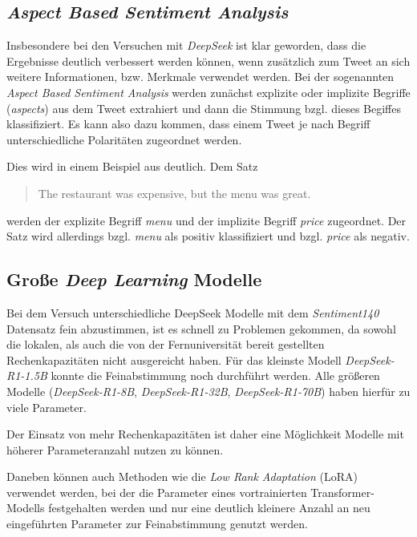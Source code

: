 \subsection{\textit{Aspect Based Sentiment Analysis}}
Insbesondere bei den Versuchen mit \textit{DeepSeek} ist klar geworden, dass die Ergebnisse deutlich verbessert werden können, wenn zusätzlich zum Tweet an sich weitere Informationen, bzw. Merkmale verwendet werden. Bei der sogenannten \textit{Aspect Based Sentiment Analysis} werden zunächst explizite oder implizite Begriffe (\textit{aspects}) aus dem Tweet extrahiert und dann die Stimmung bzgl. dieses Begiffes klassifiziert.
Es kann also dazu kommen, dass einem Tweet je nach Begriff unterschiedliche Polaritäten zugeordnet werden.

Dies wird in einem Beispiel aus \cite{Hua_2024} deutlich. Dem Satz
\begin{quote}
\glqq The restaurant was expensive, but the menu was great.\grqq 
\end{quote}
werden der explizite Begriff \textit{menu} und der implizite Begriff \textit{price} zugeordnet. 
Der Satz wird allerdings bzgl. \textit{menu} als positiv klassifiziert und bzgl. \textit{price} als negativ.


\subsection{Große \textit{Deep Learning} Modelle}
Bei dem Versuch unterschiedliche DeepSeek Modelle mit dem \textit{Sentiment140} Datensatz fein abzustimmen, ist es schnell zu Problemen gekommen, da sowohl die lokalen, als auch die von der Fernuniversität bereit gestellten Rechenkapazitäten nicht ausgereicht haben. 
Für das kleinste Modell \textit{DeepSeek-R1-1.5B} konnte die Feinabstimmung noch durchführt werden. Alle größeren Modelle (\textit{DeepSeek-R1-8B}, \textit{DeepSeek-R1-32B}, \textit{DeepSeek-R1-70B}) haben hierfür zu viele Parameter. 

Der Einsatz von mehr Rechenkapazitäten ist daher eine Möglichkeit Modelle mit höherer Parameteranzahl nutzen zu können. 

Daneben können auch Methoden wie die \textit{Low Rank Adaptation} (LoRA) \cite{lora2021} verwendet werden, bei der die Parameter eines vortrainierten Transformer-Modells festgehalten werden und nur eine deutlich kleinere Anzahl an neu eingeführten Parameter zur Feinabstimmung genutzt werden.

